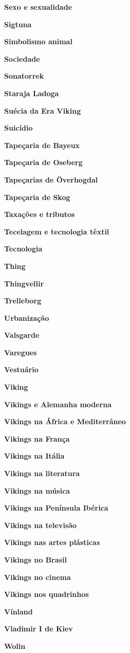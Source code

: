 \textbf{Sexo e sexualidade}

\textbf{Sigtuna}

\textbf{Simbolismo animal}

\textbf{Sociedade}

\textbf{Sonatorrek}

\textbf{Staraja Ladoga}

\textbf{Suécia da Era Viking}

\textbf{Suicídio}

\textbf{Tapeçaria de Bayeux}

\textbf{Tapeçaria de Oseberg}

\textbf{Tapeçarias de Överhogdal}

\textbf{Tapeçaria de Skog}

\textbf{Taxações e tributos}

\textbf{Tecelagem e tecnologia têxtil}

\textbf{Tecnologia}

\textbf{Thing}

\textbf{Thingvellir}

\textbf{Trelleborg}

\textbf{Urbanização}

\textbf{Valsgarde}

\textbf{Varegues}

\textbf{Vestuário}

\textbf{Viking}

\textbf{Vikings e Alemanha moderna}

\textbf{Vikings na África e Mediterrâneo}

\textbf{Vikings na França}

\textbf{Vikings na Itália}

\textbf{Vikings na literatura}

\textbf{Vikings na música}

\textbf{Vikings na Península Ibérica}

\textbf{Vikings na televisão}

\textbf{Vikings nas artes plásticas}

\textbf{Vikings no Brasil}

\textbf{Vikings no cinema}

\textbf{Vikings nos quadrinhos}

\textbf{Vínland}

\textbf{Vladimir I de Kiev}

\textbf{Wolin}
